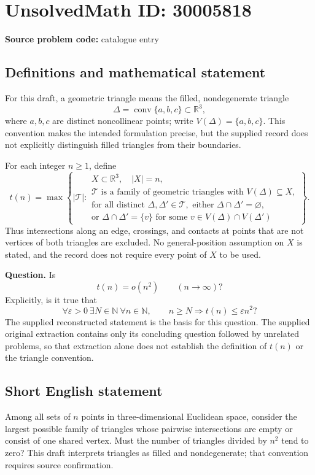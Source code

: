 \documentclass[11pt]{article}
\newcommand{\N}{\mathbb{N}}
\newcommand{\R}{\mathbb{R}}
\begin{document}
\section*{UnsolvedMath ID: 30005818}
\textbf{Source problem code:} catalogue entry
\subsection{Definitions and mathematical statement}
For this draft, a geometric triangle means the filled, nondegenerate triangle
\[
\Delta=\operatorname{conv}\{a,b,c\}\subset\R^3,
\]
where \(a,b,c\) are distinct noncollinear points; write \(V(\Delta)=\{a,b,c\}\). This convention makes the intended formulation precise, but the supplied record does not explicitly distinguish filled triangles from their boundaries.

For each integer \(n\geq 1\), define
\[
t(n)=\max\left\{|\mathcal T|:\begin{array}{l}
X\subset\R^3,\quad |X|=n,\\
\mathcal T\text{ is a family of geometric triangles with }V(\Delta)\subseteq X,\\
\text{for all distinct }\Delta,\Delta'\in\mathcal T,\text{ either }\Delta\cap\Delta'=\varnothing,\\
\text{or }\Delta\cap\Delta'=\{v\}\text{ for some }v\in V(\Delta)\cap V(\Delta')
\end{array}\right\}.
\]
Thus intersections along an edge, crossings, and contacts at points that are not vertices of both triangles are excluded. No general-position assumption on \(X\) is stated, and the record does not require every point of \(X\) to be used.

\textbf{Question.} Is
\[
t(n)=o(n^2)\qquad(n\to\infty)?
\]
Explicitly, is it true that
\[
\forall\varepsilon>0\ \exists N\in\N\ \forall n\in\N,
\qquad n\geq N\Longrightarrow t(n)\leq\varepsilon n^2?
\]
The supplied reconstructed statement is the basis for this question. The supplied original extraction contains only its concluding question followed by unrelated problems, so that extraction alone does not establish the definition of \(t(n)\) or the triangle convention.
\subsection{Short English statement}
Among all sets of \(n\) points in three-dimensional Euclidean space, consider the largest possible family of triangles whose pairwise intersections are empty or consist of one shared vertex. Must the number of triangles divided by \(n^2\) tend to zero? This draft interprets triangles as filled and nondegenerate; that convention requires source confirmation.
\end{document}
